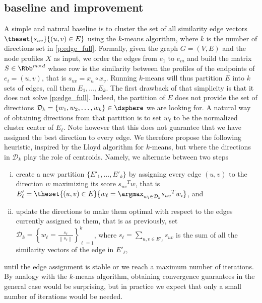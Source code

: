 \subsection{\kmeans{} baseline and improvement}
\label{sub:edge_baseline}

A simple and natural baseline is to cluster the set of all similarity edge vectors $
\theset{s_{uv}}{(u,v) \in E}$ using the $k$-means algorithm, where $k$ is the number of directions
set in \autoref{p:edge_full}. Formally, given the graph $G=(V,E)$ and the node profiles $X$ as
input, we order the edges from $e_1$ to $e_m$ and build the matrix $S \in \Rbb^{m\times d}$ whose
\ith{} row is the similarity between the profiles of the endpoints of $e_i=(u,v)$, that is $s_{uv} =
x_u \circ x_v$. Running $k$-means will thus partition $E$ into $k$ sets of edges, call them $E_1,
\ldots, E_k$. The first drawback of that simplicity is that it does not solve \autoref{p:edge_full}.
Indeed, the partition of $E$ does not provide the set of directions $\mathcal{D}_k = \{w_1, w_2,
\ldots, w_k\} \in \dsphere$ we are looking for. A natural way of obtaining directions from that
partition is to set $w_\ell$ to be the normalized cluster center of $E_\ell$. Note however that
this does not guarantee that we have assigned the best direction to every edge. We therefore propose
the following heuristic, inspired by the Lloyd algorithm for $k$-means, but where the directions in
$\mathcal{D}_k$ play the role of centroids. Namely, we alternate between two steps
\begin{enumerate}[(i), nosep]
  \item create a new partition $\{E'_1, \ldots, E'_k\}$ by assigning every edge $(u,v)$ to the
    direction $w$ maximizing its score ${s_{uv}}^T w$, that is $E'_\ell = \theset{(u,v) \in E}{
    w_\ell = \argmax_{w_i \in \mathcal{D}_k} {s_{uv}}^T w_i}$, and
  \item update the directions to make them optimal with respect to the edges currently assigned to
    them, that is as previously, set $\mathcal{D}_k = \left\{ w_\ell = \frac{s_\ell}{\left\| s_\ell
    \right\|}\right\}_{\ell=1}^k $, where $s_\ell = \sum_{u,v \in E'_\ell} s_{uv}$ is the sum of all
    the similarity vectors of the edge in $E'_\ell$,
\end{enumerate}
until the edge assignment is stable or we reach a maximum number of iterations. By analogy with the
$k$-means algorithm, obtaining convergence guarantees in the general case would be surprising, but in
practice we expect that only a small number of iterations would be needed.

